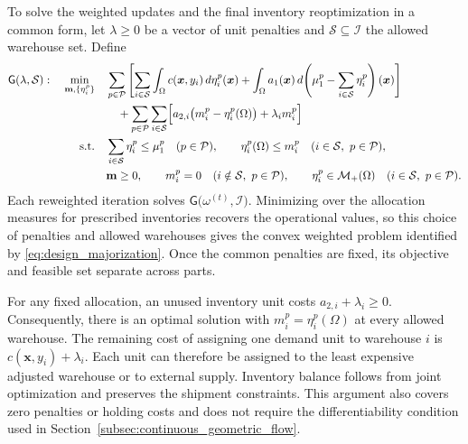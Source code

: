 \documentclass[a4paper,fleqn]{cas-sc}
\theoremstyle{remark}
\theoremstyle{plain}
\begin{document}
To solve the weighted updates and the final inventory reoptimization in a common form, let $\lambda\ge0$ be a vector of unit penalties and $\mathcal S\subseteq\mathcal I$ the allowed warehouse set. Define
\begin{subequations}\label{eq:weighted_design_problem}
\allowdisplaybreaks[0]
\begin{align}
    \mathsf G(\lambda,\mathcal S):\quad
    \min_{\mathbf m,\{\eta_i^p\}}\quad
       &\sum_{p\in\mathcal P}\left[\sum_{i\in\mathcal S}\int_\Omega c(\bm x,y_i)\,d\eta_i^p(\bm x)
          +\int_\Omega a_1(\bm x)\,d\!\left(\mu_1^p-\sum_{i\in\mathcal S}\eta_i^p\right)(\bm x)\right]\notag\\
       &\quad+\sum_{p\in\mathcal P}\sum_{i\in\mathcal S}
          \Bigl[a_{2,i}\bigl(m_i^p-\eta_i^p(\Omega)\bigr)+\lambda_i m_i^p\Bigr]
          \label{eq:weighted_design_objective}\\
    \text{s.t.}\quad
       &\sum_{i\in\mathcal S}\eta_i^p\le\mu_1^p\quad(p\in\mathcal P),\qquad
          \eta_i^p(\Omega)\le m_i^p\quad(i\in\mathcal S,\ p\in\mathcal P),
          \label{eq:weighted_design_constraints}\\
       &\mathbf m\ge0,\qquad m_i^p=0\quad(i\notin\mathcal S,\ p\in\mathcal P),\qquad
          \eta_i^p\in\mathcal M_+(\Omega)\quad(i\in\mathcal S,\ p\in\mathcal P).
          \label{eq:weighted_design_domains}
\end{align}
\end{subequations}
Each reweighted iteration solves $\mathsf G\bigl(\omega^{(t)},\mathcal I\bigr)$. Minimizing over the allocation measures for prescribed inventories recovers the operational values, so this choice of penalties and allowed warehouses gives the convex weighted problem identified by \eqref{eq:design_majorization}. Once the common penalties are fixed, its objective and feasible set separate across parts.

For any fixed allocation, an unused inventory unit costs $a_{2,i}+\lambda_i\ge0$. Consequently, there is an optimal solution with $m_i^p=\eta_i^p(\Omega)$ at every allowed warehouse. The remaining cost of assigning one demand unit to warehouse $i$ is $c(\bm x,y_i)+\lambda_i$. Each unit can therefore be assigned to the least expensive adjusted warehouse or to external supply. Inventory balance follows from joint optimization and preserves the shipment constraints. This argument also covers zero penalties or holding costs and does not require the differentiability condition used in Section~\ref{subsec:continuous_geometric_flow}.
\end{document}
